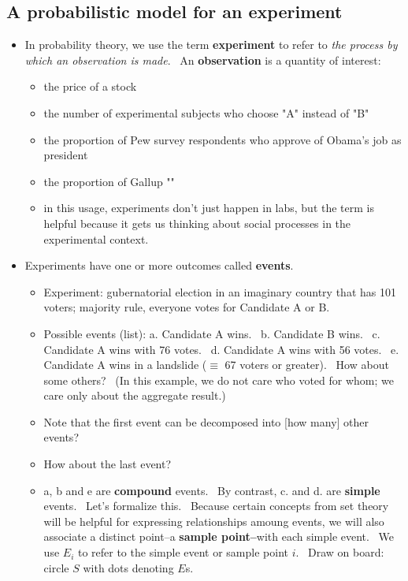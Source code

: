 \documentclass[11pt]{article}
\begin{document}
\subsection{A probabilistic model for an experiment}

\begin{itemize}
\item In probability theory, we use the term \textbf{experiment }to refer to 
\textit{the process by which an observation is made}. \ An \textbf{%
observation }is a quantity of interest:

\begin{itemize}
\item the price of a stock

\item the number of experimental subjects who choose "A" instead of "B"

\item the proportion of Pew survey respondents who approve of Obama's job as
president

\item the proportion of Gallup ""

\item in this usage, experiments don't just happen in labs, but the term is
helpful because it gets us thinking about social processes in the
experimental context.
\end{itemize}

\item Experiments have one or more outcomes called \textbf{events}.

\begin{itemize}
\item Experiment: gubernatorial election in an imaginary country that has
101 voters; majority rule, everyone votes for Candidate A or B.

\item Possible events (list): a. Candidate A wins. \ b. Candidate B wins. \
c. Candidate A wins with 76 votes. \ d. Candidate A wins with 56 votes. \ e.
Candidate A wins in a landslide ($\equiv $ 67 voters or greater). \ How
about some others? \ (In this example, we do not care who voted for whom; we
care only about the aggregate result.)

\item Note that the first event can be decomposed into [how many] other
events?

\item How about the last event?

\item a, b and e are \textbf{compound }events. \ By contrast, c. and d. are 
\textbf{simple }events. \ Let's formalize this. \ Because certain concepts
from set theory will be helpful for expressing relationships amoung events,
we will also associate a distinct point--a \textbf{sample point--}with each
simple event. \ We use $E_{i}$ to refer to the simple event or sample point $%
i$. \ Draw on board: circle $S$ with dots denoting $E$s.


\end{itemize}
\end{itemize}
\end{document}
